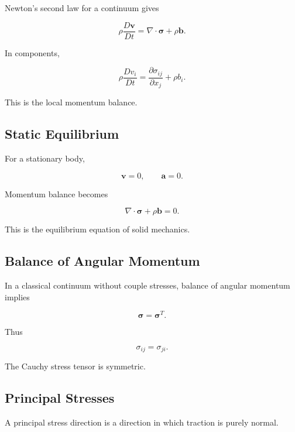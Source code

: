 Newton's second law for a continuum gives

\[
\boxed{
\rho
\frac{D\mathbf{v}}{Dt}
=
\nabla\cdot\boldsymbol{\sigma}
+
\rho\mathbf{b}.
}
\]

In components,

\[
\boxed{
\rho
\frac{Dv_i}{Dt}
=
\frac{\partial\sigma_{ij}}
{\partial x_j}
+
\rho b_i.
}
\]

This is the local momentum balance.

\subsection{Static Equilibrium}
\label{subsec:continuum-static-equilibrium}

For a stationary body,

\[
\mathbf{v}=0,
\qquad
\mathbf{a}=0.
\]

Momentum balance becomes

\[
\boxed{
\nabla\cdot\boldsymbol{\sigma}
+
\rho\mathbf{b}
=
0.
}
\]

This is the equilibrium equation of solid mechanics.

\subsection{Balance of Angular Momentum}
\label{subsec:balance-angular-momentum}

In a classical continuum without couple stresses, balance of angular
momentum implies

\[
\boxed{
\boldsymbol{\sigma}
=
\boldsymbol{\sigma}^{T}.
}
\]

Thus

\[
\boxed{
\sigma_{ij}
=
\sigma_{ji}.
}
\]

The Cauchy stress tensor is symmetric.

\subsection{Principal Stresses}
\label{subsec:principal-stresses}

A principal stress direction is a direction in which traction is purely
normal.

